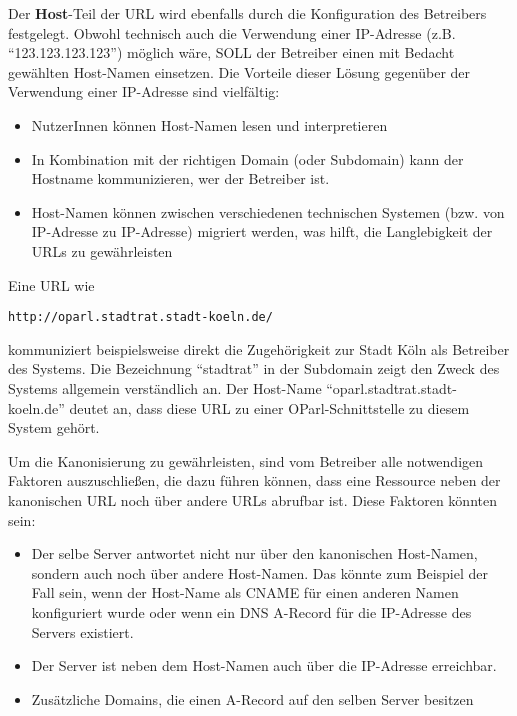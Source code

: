 \documentclass[,a4paper]{article}
\begin{document}
Der \textbf{Host}-Teil der URL wird ebenfalls durch die Konfiguration
des Betreibers festgelegt. Obwohl technisch auch die Verwendung einer
IP-Adresse (z.B. ``123.123.123.123'') möglich wäre, SOLL der Betreiber
einen mit Bedacht gewählten Host-Namen einsetzen. Die Vorteile dieser
Lösung gegenüber der Verwendung einer IP-Adresse sind vielfältig:

\begin{itemize}
\itemsep1pt\parskip0pt
\item
  NutzerInnen können Host-Namen lesen und interpretieren
\item
  In Kombination mit der richtigen Domain (oder Subdomain) kann der
  Hostname kommunizieren, wer der Betreiber ist.
\item
  Host-Namen können zwischen verschiedenen technischen Systemen (bzw.
  von IP-Adresse zu IP-Adresse) migriert werden, was hilft, die
  Langlebigkeit der URLs zu gewährleisten
\end{itemize}

Eine URL wie

\begin{verbatim}
http://oparl.stadtrat.stadt-koeln.de/
\end{verbatim}

kommuniziert beispielsweise direkt die Zugehörigkeit zur Stadt Köln als
Betreiber des Systems. Die Bezeichnung ``stadtrat'' in der Subdomain
zeigt den Zweck des Systems allgemein verständlich an. Der Host-Name
``oparl.stadtrat.stadt-koeln.de'' deutet an, dass diese URL zu einer
OParl-Schnittstelle zu diesem System gehört.

Um die Kanonisierung zu gewährleisten, sind vom Betreiber alle
notwendigen Faktoren auszuschließen, die dazu führen können, dass eine
Ressource neben der kanonischen URL noch über andere URLs abrufbar ist.
Diese Faktoren könnten sein:

\begin{itemize}
\item
  Der selbe Server antwortet nicht nur über den kanonischen Host-Namen,
  sondern auch noch über andere Host-Namen. Das könnte zum Beispiel der
  Fall sein, wenn der Host-Name als CNAME für einen anderen Namen
  konfiguriert wurde oder wenn ein DNS A-Record für die IP-Adresse des
  Servers existiert.
\item
  Der Server ist neben dem Host-Namen auch über die IP-Adresse
  erreichbar.
\item
  Zusätzliche Domains, die einen A-Record auf den selben Server besitzen
\end{itemize}
\end{document}
